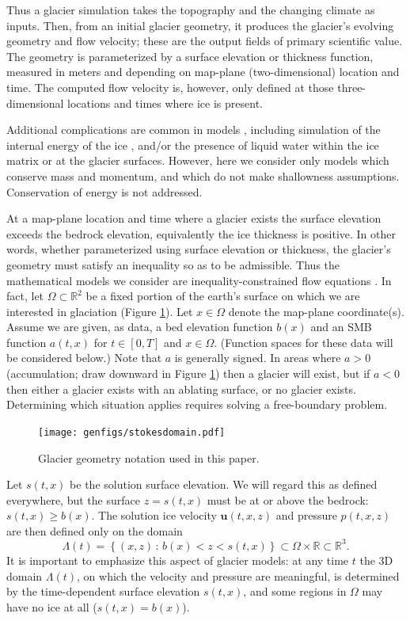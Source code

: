 \documentclass[hidelinks,onefignum,onetabnum,final]{siamart220329}  %
\newcommand{\RR}{\mathbb{R}}
\newcommand{\bu}{\mathbf{u}}
\begin{document}
Thus a glacier simulation takes the topography and the changing climate as inputs.  Then, from an initial glacier geometry, it produces the glacier's evolving geometry and flow velocity; these are the output fields of primary scientific value.  The geometry is parameterized by a surface elevation or thickness function, measured in meters and depending on map-plane (two-dimensional) location and time.  The computed flow velocity is, however, only defined at those three-dimensional locations and times where ice is present.

Additional complications are common in models \cite{GreveBlatter2009}, including simulation of the internal energy of the ice \cite{Aschwandenetal2012}, and/or the presence of liquid water within the ice matrix or at the glacier surfaces.  However, here we consider only models which conserve mass and momentum, and which do not make shallowness assumptions.  Conservation of energy is not addressed.

At a map-plane location and time where a glacier exists the surface elevation exceeds the bedrock elevation, equivalently the ice thickness is positive.  In other words, whether parameterized using surface elevation or thickness, the glacier's geometry must satisfy an inequality so as to be admissible.  Thus the mathematical models we consider are inequality-constrained flow equations \cite{Bueler2021conservation}.  In fact, let $\Omega \subset \RR^2$ be a fixed portion of the earth's surface on which we are interested in glaciation (Figure \ref{fig:stokesdomain}).  Let $x\in\Omega$ denote the map-plane coordinate(s).  Assume we are given, as data, a bed elevation function $b(x)$ and an SMB function $a(t,x)$ for $t\in [0,T]$ and $x\in \Omega$.  (Function spaces for these data will be considered below.)  Note that $a$ is generally signed.  In areas where $a>0$ (accumulation; draw downward in Figure \ref{fig:stokesdomain}) then a glacier will exist, but if $a<0$ then either a glacier exists with an ablating surface, or no glacier exists.  Determining which situation applies requires solving a free-boundary problem.

\medskip
\begin{figure}[ht]
\centering
\texttt{[image: genfigs/stokesdomain.pdf]}
\caption{Glacier geometry notation used in this paper.}
\label{fig:stokesdomain}
\end{figure}

\medskip
Let $s(t,x)$ be the solution surface elevation.  We will regard this as defined everywhere, but the surface $z=s(t,x)$ must be at or above the bedrock: $s(t,x) \ge b(x)$.  The solution ice velocity $\bu(t,x,z)$ and pressure $p(t,x,z)$ are then defined only on the domain
\begin{equation}
\Lambda(t) = \left\{(x,z)\,:\,b(x) < z < s(t,x)\right\} \subset \Omega \times \RR \subset \RR^3. \label{eq:icydomain}
\end{equation}
It is important to emphasize this aspect of glacier models: at any time $t$ the 3D domain $\Lambda(t)$, on which the velocity and pressure are meaningful, is determined by the time-dependent surface elevation $s(t,x)$, and some regions in $\Omega$ may have no ice at all ($s(t,x)=b(x)$).
\end{document}
